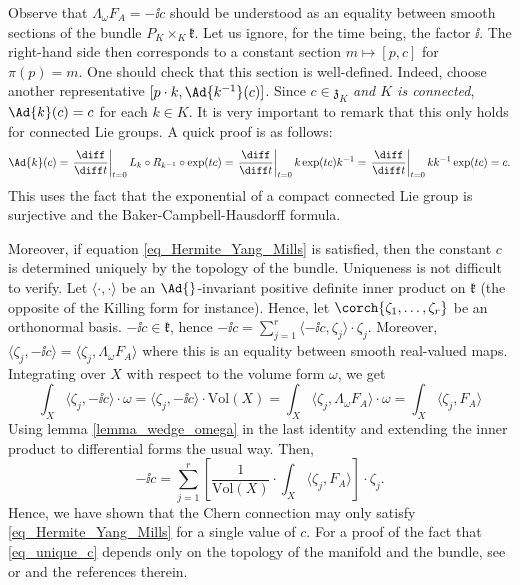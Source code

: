 \begin{obs} \label{obs_HYM_center_Lie_algebra}
    Observe that \(\Lambda_\omega F_A=-\ii c\) should be understood as an equality between smooth sections of the bundle \(P_K \times _K \mathfrak{k}\). Let us ignore, for the time being, the factor \(\ii\). The right-hand side then corresponds to a constant section \(m \mapsto [p, c]\) for \(\pi(p)=m\). One should check that this section is well-defined. Indeed, choose another representative \([p\cdot k, \Ad{k^{-1}}(c)]\). Since \(c \in \mathfrak{z}_K\) \textit{and \(K\) is connected}, \(\Ad{k}(c)=c\) for each \(k \in K\). It is very important to remark that this only holds for connected Lie groups. A quick proof is as follows:
    \begin{align*}
        \Ad{k}(c) =\left.  \frac{\diff}{\diff t}\right|_{t=0} L_k \circ R_{k^{-1}} \circ \exp(tc) = \left.  \frac{\diff}{\diff t}\right|_{t=0}  k \exp(tc)k^{-1}=\left.  \frac{\diff}{\diff t}\right|_{t=0} kk^{-1}\exp(tc)=c.
    \end{align*}
    This uses the fact that the exponential of a compact connected Lie group is surjective \parencite[Cor. 12.2.3]{hilgert2011structure} and the Baker-Campbell-Hausdorff formula.

    Moreover, if equation \eqref{eq_Hermite_Yang_Mills} is satisfied, then the constant \(c\) is determined uniquely by the topology of the bundle. Uniqueness is not difficult to verify. Let \(\langle \cdot, \cdot \rangle\) be an \(\Ad{}\)-invariant positive definite inner product on \(\mathfrak{k}\) (the opposite of the Killing form for instance). Hence, let \(\corch{\zeta_1, \ldots, \zeta_r}\) be an orthonormal basis. \(-\ii c \in \mathfrak{k}\), hence \(-\ii c=\sum_{j=1}^r \langle-\ii c,\zeta_j\rangle \cdot \zeta_j \). Moreover, \(\langle \zeta_j, -\ii c \rangle=\langle\zeta_j, \Lambda_\omega F_A \rangle\) where this is an equality between smooth real-valued maps. Integrating over \(X\) with respect to the volume form \(\omega\), we get
    \[
    \int_X\langle\zeta_j, -\ii c\rangle \cdot \omega = \langle \zeta_j, -\ii c \rangle \cdot \mathrm{Vol}(X)=\int_X \langle \zeta_j , \Lambda_\omega F_A \rangle \cdot \omega = \int_X \langle \zeta_j, F_A \rangle  
    \]
    Using lemma \ref{lemma_wedge_omega} in the last identity and extending the inner product to differential forms the usual way. Then,
    \begin{equation} \label{eq_unique_c}
    -\ii c = \sum_{j=1}^r \left[\frac{1}{\mathrm{Vol}(X)} \cdot \int_X \langle \zeta_j,  F_A \rangle \right]\cdot \zeta_j.
    \end{equation}
    Hence, we have shown that the Chern connection may only satisfy \eqref{eq_Hermite_Yang_Mills} for a single value of \(c\). For a proof of the fact that \eqref{eq_unique_c} depends only on the topology of the manifold and the bundle, see \parencite[Prop. 3.4]{garcia2014connectedness} or \parencite[Remark 1.2]{alvarez2013coupled} and the references therein. 
\end{obs}
